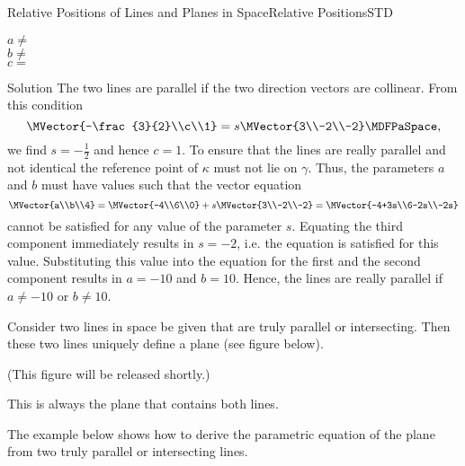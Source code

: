 \begin{MXContent}{Relative Positions of Lines and Planes in Space}{Relative Positions}{STD}
\begin{MExercise}
$a\neq$\\
$b\neq$\\
$c=$
\end{MExercise}

\begin{MHint}{Solution}
The two lines are parallel if the two direction vectors are collinear. From this condition
\[
 \MVector{-\frac{3}{2}\\c\\1}=s\MVector{3\\-2\\-2}  \MDFPaSpace ,
\]
we find $s=-\frac{1}{2}$ and hence $c=1$. To ensure that the lines are really parallel and not identical 
the reference point of $\kappa$ must not lie on $\gamma$. Thus, the parameters $a$ and $b$ must have values 
such that the vector equation 
\[
 \MVector{a\\b\\4}=\MVector{-4\\6\\0}+s\MVector{3\\-2\\-2}=\MVector{-4+3s\\6-2s\\-2s}
\]
cannot be satisfied for any value of the parameter $s$. Equating the third component immediately results in 
$s=-2$, i.e. the equation is satisfied for this value. Substituting this value into the equation for the 
first and the second component results in $a=-10$ and $b=10$. Hence, the lines are really parallel 
if $a\neq-10$ or $b\neq10$.
\end{MHint}

Consider two lines in space be given that are truly parallel or intersecting. Then 
these two lines uniquely define a plane (see figure below).

(This figure will be released shortly.)

This is always the plane that contains both lines.

The example below shows how to derive the parametric equation of the plane from 
two truly parallel or intersecting lines.



\end{MXContent}
